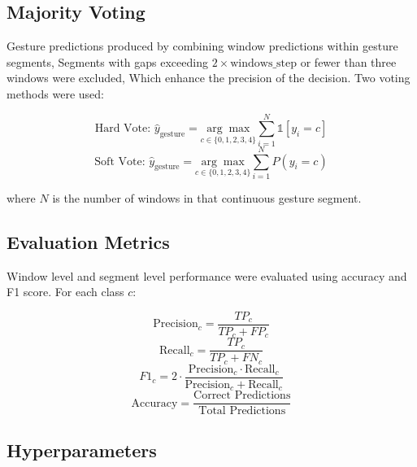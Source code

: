 \documentclass[article,submit,pdftex,moreauthors]{Definitions/mdpi}
\begin{document}
\subsection{Majority Voting}

Gesture predictions  produced by combining window predictions within gesture segments, Segments with gaps exceeding $2\times\text{windows\_step}$ or fewer than three windows were excluded, Which enhance the precision of the decision. Two voting methods were used:
\begin{linenomath}
\begin{equation}
\text{Hard Vote: } \hat{y}_{\text{gesture}} = \underset{c \in \{0,1,2,3,4\}}{\arg\max} \sum_{i=1}^{N} \mathbb{1}[y_i = c]
\end{equation}
\begin{equation}
\text{Soft Vote: } \hat{y}_{\text{gesture}} = \underset{c \in \{0,1,2,3,4\}}{\arg\max} \sum_{i=1}^{N} P(y_i = c)
\end{equation}
\end{linenomath}
where $N$ is the number of windows in that continuous gesture segment.

\subsection{Evaluation Metrics}

Window level and segment level performance were evaluated using accuracy and F1 score. For each class $c$:
\begin{linenomath}
\begin{equation}
\text{Precision}_c = \frac{TP_c}{TP_c + FP_c}
\end{equation}
\begin{equation}
\text{Recall}_c = \frac{TP_c}{TP_c + FN_c}
\end{equation}
\begin{equation}
F1_c = 2 \cdot \frac{\text{Precision}_c \cdot \text{Recall}_c}{\text{Precision}_c + \text{Recall}_c}
\end{equation}
\begin{equation}
\text{Accuracy} = \frac{\text{Correct Predictions}}{\text{Total Predictions}}
\end{equation}

\end{linenomath}

\subsection{Hyperparameters}
\end{document}
